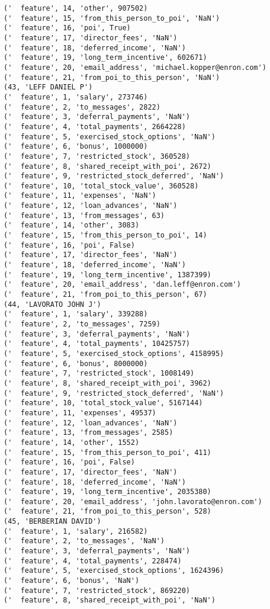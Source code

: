 \begin{verbatim}
('  feature', 14, 'other', 907502)
('  feature', 15, 'from_this_person_to_poi', 'NaN')
('  feature', 16, 'poi', True)
('  feature', 17, 'director_fees', 'NaN')
('  feature', 18, 'deferred_income', 'NaN')
('  feature', 19, 'long_term_incentive', 602671)
('  feature', 20, 'email_address', 'michael.kopper@enron.com')
('  feature', 21, 'from_poi_to_this_person', 'NaN')
(43, 'LEFF DANIEL P')
('  feature', 1, 'salary', 273746)
('  feature', 2, 'to_messages', 2822)
('  feature', 3, 'deferral_payments', 'NaN')
('  feature', 4, 'total_payments', 2664228)
('  feature', 5, 'exercised_stock_options', 'NaN')
('  feature', 6, 'bonus', 1000000)
('  feature', 7, 'restricted_stock', 360528)
('  feature', 8, 'shared_receipt_with_poi', 2672)
('  feature', 9, 'restricted_stock_deferred', 'NaN')
('  feature', 10, 'total_stock_value', 360528)
('  feature', 11, 'expenses', 'NaN')
('  feature', 12, 'loan_advances', 'NaN')
('  feature', 13, 'from_messages', 63)
('  feature', 14, 'other', 3083)
('  feature', 15, 'from_this_person_to_poi', 14)
('  feature', 16, 'poi', False)
('  feature', 17, 'director_fees', 'NaN')
('  feature', 18, 'deferred_income', 'NaN')
('  feature', 19, 'long_term_incentive', 1387399)
('  feature', 20, 'email_address', 'dan.leff@enron.com')
('  feature', 21, 'from_poi_to_this_person', 67)
(44, 'LAVORATO JOHN J')
('  feature', 1, 'salary', 339288)
('  feature', 2, 'to_messages', 7259)
('  feature', 3, 'deferral_payments', 'NaN')
('  feature', 4, 'total_payments', 10425757)
('  feature', 5, 'exercised_stock_options', 4158995)
('  feature', 6, 'bonus', 8000000)
('  feature', 7, 'restricted_stock', 1008149)
('  feature', 8, 'shared_receipt_with_poi', 3962)
('  feature', 9, 'restricted_stock_deferred', 'NaN')
('  feature', 10, 'total_stock_value', 5167144)
('  feature', 11, 'expenses', 49537)
('  feature', 12, 'loan_advances', 'NaN')
('  feature', 13, 'from_messages', 2585)
('  feature', 14, 'other', 1552)
('  feature', 15, 'from_this_person_to_poi', 411)
('  feature', 16, 'poi', False)
('  feature', 17, 'director_fees', 'NaN')
('  feature', 18, 'deferred_income', 'NaN')
('  feature', 19, 'long_term_incentive', 2035380)
('  feature', 20, 'email_address', 'john.lavorato@enron.com')
('  feature', 21, 'from_poi_to_this_person', 528)
(45, 'BERBERIAN DAVID')
('  feature', 1, 'salary', 216582)
('  feature', 2, 'to_messages', 'NaN')
('  feature', 3, 'deferral_payments', 'NaN')
('  feature', 4, 'total_payments', 228474)
('  feature', 5, 'exercised_stock_options', 1624396)
('  feature', 6, 'bonus', 'NaN')
('  feature', 7, 'restricted_stock', 869220)
('  feature', 8, 'shared_receipt_with_poi', 'NaN')

\end{verbatim}
